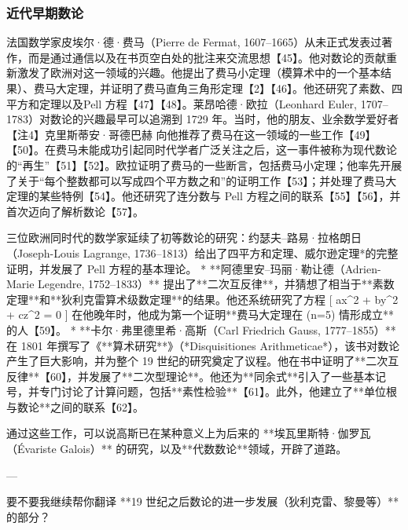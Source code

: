 \subsubsection{近代早期数论}
法国数学家皮埃尔·德·费马（Pierre de Fermat, 1607–1665）从未正式发表过著作，而是通过通信以及在书页空白处的批注来交流思想【45】。他对数论的贡献重新激发了欧洲对这一领域的兴趣。他提出了费马小定理（模算术中的一个基本结果）、费马大定理，并证明了费马直角三角形定理【2】【46】。他还研究了素数、四平方和定理以及Pell 方程【47】【48】。莱昂哈德·欧拉（Leonhard Euler, 1707–1783）对数论的兴趣最早可以追溯到 1729 年。当时，他的朋友、业余数学爱好者【注4】克里斯蒂安·哥德巴赫 向他推荐了费马在这一领域的一些工作【49】【50】。在费马未能成功引起同时代学者广泛关注之后，这一事件被称为现代数论的“再生”【51】【52】。欧拉证明了费马的一些断言，包括费马小定理；他率先开展了关于“每个整数都可以写成四个平方数之和”的证明工作【53】；并处理了费马大定理的某些特例【54】。他还研究了连分数与 Pell 方程之间的联系【55】【56】，并首次迈向了解析数论【57】。

三位欧洲同时代的数学家延续了初等数论的研究：约瑟夫–路易·拉格朗日（Joseph-Louis Lagrange, 1736–1813）给出了四平方和定理、威尔逊定理*的完整证明，并发展了 Pell 方程的基本理论。
* **阿德里安–玛丽·勒让德（Adrien-Marie Legendre, 1752–1833）** 提出了**二次互反律**，并猜想了相当于**素数定理**和**狄利克雷算术级数定理**的结果。他还系统研究了方程
  [
  ax^{2} + by^{2} + cz^{2} = 0
  ]
  在他晚年时，他成为第一个证明**费马大定理在 (n=5) 情形成立**的人【59】。
* **卡尔·弗里德里希·高斯（Carl Friedrich Gauss, 1777–1855）** 在 1801 年撰写了《**算术研究**》（*Disquisitiones Arithmeticae*），该书对数论产生了巨大影响，并为整个 19 世纪的研究奠定了议程。他在书中证明了**二次互反律**【60】，并发展了**二次型理论**。他还为**同余式**引入了一些基本记号，并专门讨论了计算问题，包括**素性检验**【61】。此外，他建立了**单位根与数论**之间的联系【62】。

通过这些工作，可以说高斯已在某种意义上为后来的 **埃瓦里斯特·伽罗瓦（Évariste Galois）** 的研究，以及**代数数论**领域，开辟了道路。

---

要不要我继续帮你翻译 **19 世纪之后数论的进一步发展（狄利克雷、黎曼等）** 的部分？
